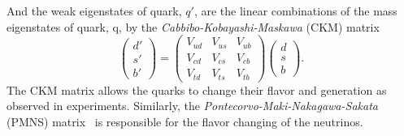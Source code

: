%
And the weak eigenstates of quark, $q'$, are the linear combinations of the mass eigenstates of quark, q, by the \textit{Cabbibo-Kobayashi-Maskawa} (CKM) matrix~\cite{Kobayashi:1973fv}
%
\begin{equation}
    \left(\begin{matrix}d'\\s'\\b'\end{matrix}\right) = \left(\begin{matrix}V_{ud} & V_{us} & V_{ub}\\V_{cd} & V_{cs} & V_{cb}\\V_{td} & V_{ts} &V_{tb}\end{matrix}\right) \left(\begin{matrix}d\\s\\b\end{matrix}\right).
    \label{eq:sm_CKM_matrix}
\end{equation}
%
The CKM matrix allows the quarks to change their flavor and generation as observed in experiments.
Similarly, the \textit{Pontecorvo-Maki-Nakagawa-Sakata} (PMNS) matrix~\cite{Maki:1962mu} is responsible for the flavor changing of the neutrinos.


